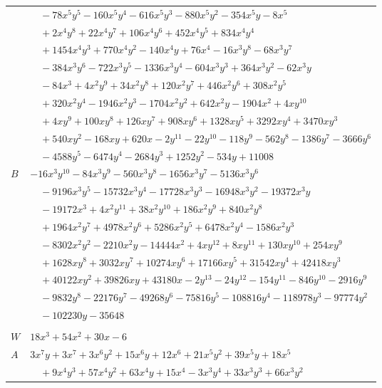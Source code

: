 \documentclass[11pt]{article}
\begin{document}
\begin{longtable}{@{}ll@{}}
 & $\quad -78x^{5}y^{5}-160x^{5}y^{4}-616x^{5}y^{3}-880x^{5}y^{2}-354x^{5}y-8x^{5}$\\
 & $\quad +2x^{4}y^{8}+22x^{4}y^{7}+106x^{4}y^{6}+452x^{4}y^{5}+834x^{4}y^{4}$\\
 & $\quad +1454x^{4}y^{3}+770x^{4}y^{2}-140x^{4}y+76x^{4}-16x^{3}y^{8}-68x^{3}y^{7}$\\
 & $\quad -384x^{3}y^{6}-722x^{3}y^{5}-1336x^{3}y^{4}-604x^{3}y^{3}+364x^{3}y^{2}-62x^{3}y$\\
 & $\quad -84x^{3}+4x^{2}y^{9}+34x^{2}y^{8}+120x^{2}y^{7}+446x^{2}y^{6}+308x^{2}y^{5}$\\
 & $\quad +320x^{2}y^{4}-1946x^{2}y^{3}-1704x^{2}y^{2}+642x^{2}y-1904x^{2}+4xy^{10}$\\
 & $\quad +4xy^{9}+100xy^{8}+126xy^{7}+908xy^{6}+1328xy^{5}+3292xy^{4}+3470xy^{3}$\\
 & $\quad +540xy^{2}-168xy+620x-2y^{11}-22y^{10}-118y^{9}-562y^{8}-1386y^{7}-3666y^{6}$\\
 & $\quad -4588y^{5}-6474y^{4}-2684y^{3}+1252y^{2}-534y+11008$\\
$B$ & $-16x^{3}y^{10}-84x^{3}y^{9}-560x^{3}y^{8}-1656x^{3}y^{7}-5136x^{3}y^{6}$\\
 & $\quad -9196x^{3}y^{5}-15732x^{3}y^{4}-17728x^{3}y^{3}-16948x^{3}y^{2}-19372x^{3}y$\\
 & $\quad -19172x^{3}+4x^{2}y^{11}+38x^{2}y^{10}+186x^{2}y^{9}+840x^{2}y^{8}$\\
 & $\quad +1964x^{2}y^{7}+4978x^{2}y^{6}+5286x^{2}y^{5}+6478x^{2}y^{4}-1586x^{2}y^{3}$\\
 & $\quad -8302x^{2}y^{2}-2210x^{2}y-14444x^{2}+4xy^{12}+8xy^{11}+130xy^{10}+254xy^{9}$\\
 & $\quad +1628xy^{8}+3032xy^{7}+10274xy^{6}+17166xy^{5}+31542xy^{4}+42418xy^{3}$\\
 & $\quad +40122xy^{2}+39826xy+43180x-2y^{13}-24y^{12}-154y^{11}-846y^{10}-2916y^{9}$\\
 & $\quad -9832y^{8}-22176y^{7}-49268y^{6}-75816y^{5}-108816y^{4}-118978y^{3}-97774y^{2}$\\
 & $\quad -102230y-35648$\\
\addlinespace[3pt]
\multicolumn{2}{@{}l}{$i=4$, $m=1$, neighbours $43,1,2,19,28,29,34,39$}\\
$W$ & $18x^{3}+54x^{2}+30x-6$\\
$A$ & $3x^{7}y+3x^{7}+3x^{6}y^{2}+15x^{6}y+12x^{6}+21x^{5}y^{2}+39x^{5}y+18x^{5}$\\
 & $\quad +9x^{4}y^{3}+57x^{4}y^{2}+63x^{4}y+15x^{4}-3x^{3}y^{4}+33x^{3}y^{3}+66x^{3}y^{2}$\\

\end{longtable}
\end{document}
